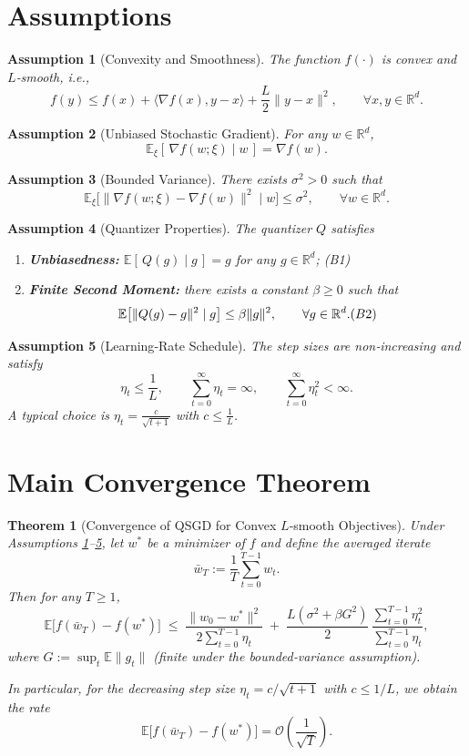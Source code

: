 \documentclass{article}
\newcommand{\EE}{\mathbb{E}}
\newcommand{\RR}{\mathbb{R}}
\newtheorem{assumption}{Assumption}
\newtheorem{theorem}{Theorem}
\begin{document}
\section*{Assumptions}
\begin{assumption}[Convexity and Smoothness]\label{ass:convex}
The function $f(\cdot)$ is convex and $L$‑smooth, i.e.,
\[
f(y)\le f(x)+\langle \nabla f(x),y-x\rangle+\frac{L}{2}\|y-x\|^2,\qquad\forall x,y\in\RR^{d}. \tag{A1}
\]
\end{assumption}
\begin{assumption}[Unbiased Stochastic Gradient]\label{ass:unbiased}
For any $w\in\RR^{d}$,
\[
\EE_{\xi}[\,\nabla f(w;\xi)\mid w\,]=\nabla f(w). \tag{A2}
\]
\end{assumption}
\begin{assumption}[Bounded Variance]\label{ass:var}
There exists $\sigma^2>0$ such that
\[
\EE_{\xi}\big[\|\nabla f(w;\xi)-\nabla f(w)\|^2\mid w\big]\le\sigma^2,\qquad\forall w\in\RR^{d}. \tag{A3}
\]
\end{assumption}
\begin{assumption}[Quantizer Properties]\label{ass:quant}
The quantizer $Q$ satisfies
\begin{enumerate}[label=(\roman*)]
\item \textbf{Unbiasedness:} $\EE[\,Q(g)\mid g\,]=g$ for any $g\in\RR^{d}$; \hfill (B1)
\item \textbf{Finite Second Moment:} there exists a constant $\beta\ge 0$ such that
\[
\EE\big[\|Q(g)-g\|^2\mid g\big]\le\beta\|g\|^2,\qquad\forall g\in\RR^{d}. \hfill (B2)
\]
\end{enumerate}
\end{assumption}
\begin{assumption}[Learning‑Rate Schedule]\label{ass:lr}
The step sizes are non‑increasing and satisfy
\[
\eta_t\le\frac{1}{L},\qquad \sum_{t=0}^{\infty}\eta_t =\infty,\qquad \sum_{t=0}^{\infty}\eta_t^{2}<\infty. \tag{A4}
\]
A typical choice is $\eta_t=\frac{c}{\sqrt{t+1}}$ with $c\le\frac{1}{L}$.
\end{assumption}

\section*{Main Convergence Theorem}
\begin{theorem}[Convergence of QSGD for Convex $L$‑smooth Objectives]\label{thm:convex}
Under Assumptions \ref{ass:convex}–\ref{ass:lr}, let $w^*$ be a minimizer of $f$ and define the averaged iterate
\[
\bar w_T:=\frac{1}{T}\sum_{t=0}^{T-1} w_t .
\]
Then for any $T\ge1$,
\[
\EE\!\big[f(\bar w_T)-f(w^*)\big]\;\le\;
\frac{\|w_0-w^*\|^{2}}{2\sum_{t=0}^{T-1}\eta_t}
\;+\;
\frac{L(\sigma^{2}+\beta G^{2})}{2}\,\frac{\sum_{t=0}^{T-1}\eta_t^{2}}{\sum_{t=0}^{T-1}\eta_t},
\tag{3}
\]
where $G:=\sup_{t}\EE\|g_t\|$ (finite under the bounded‑variance assumption).  

In particular, for the decreasing step size $\eta_t=c/\sqrt{t+1}$ with $c\le 1/L$, we obtain the rate
\[
\EE\!\big[f(\bar w_T)-f(w^*)\big]=\mathcal{O}\!\left(\frac{1}{\sqrt{T}}\right).
\tag{4}
\]
\end{theorem}
\end{document}
